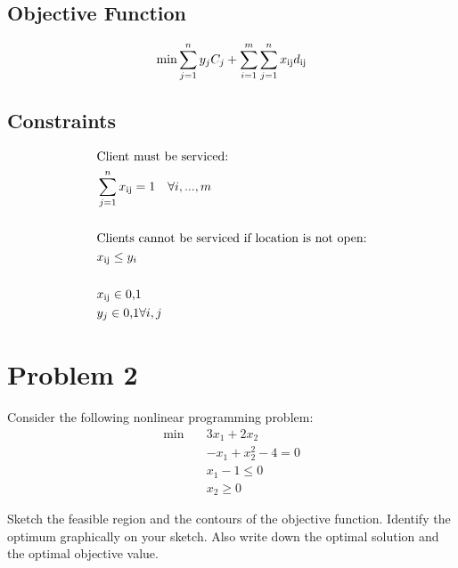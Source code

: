 \documentclass[12pt]{article}
\begin{document}
\subsection{Objective Function}
    \begin{equation*}
       \min \sum_{j=1}^{n} y_jC_j + \sum_{i=1}^{m} \sum_{j=1}^{n} x\textsubscript{ij}d\textsubscript{ij}
    \end{equation*}

\subsection{Constraints}
    \begin{align*}
        &\text{Client must be serviced:}\\
        &\sum_{j=1}^{n} x\textsubscript{ij} = 1 \quad \forall i,...,m\\ \\
        &\text{Clients cannot be serviced if location is not open:}\\
        &x\textsubscript{ij} \leq y_i\\ \\
        &x\textsubscript{ij} \in \text{{0,1}}\\
        &y_j \in \text{{0,1}} \forall i,j\\
    \end{align*}


\section{Problem 2}
Consider the following nonlinear programming problem:
\begin{align}
\min \quad &3x_1 + 2x_2  \\
&-x_1 + x_2^2 -4 = 0   \\
&x_1 - 1 \leq 0  \\
&x_2 \geq 0
\end{align}

Sketch the feasible region and the contours of the objective function.
Identify the optimum graphically on your sketch. Also write down the
optimal solution and the optimal objective value.
\end{document}
